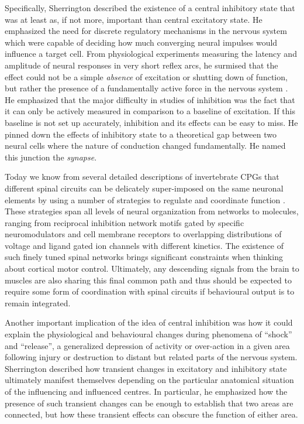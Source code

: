 Specifically, Sherrington described the existence of a central inhibitory state that was at least as, if not more, important than central excitatory state. He emphasized the need for discrete regulatory mechanisms in the nervous system which were capable of deciding how much converging neural impulses would influence a target cell. From physiological experiments measuring the latency and amplitude of neural responses in very short reflex arcs, he surmised that the effect could not be a simple \emph{absence} of excitation or shutting down of function, but rather the presence of a fundamentally active force in the nervous system \cite{Sherrington1965}. He emphasized that the major difficulty in studies of inhibition was the fact that it can only be actively measured in comparison to a baseline of excitation. If this baseline is not set up accurately, inhibition and its effects can be easy to miss. He pinned down the effects of inhibitory state to a theoretical gap between two neural cells where the nature of conduction changed fundamentally. He named this junction the \emph{synapse}.

Today we know from several detailed descriptions of invertebrate CPGs that different spinal circuits can be delicately super-imposed on the same neuronal elements by using a number of strategies to regulate and coordinate function \cite{Orlovsky1999,Selverston2010}. These strategies span all levels of neural organization from networks to molecules, ranging from reciprocal inhibition network motifs gated by specific neuromodulators and cell membrane receptors to overlapping distributions of voltage and ligand gated ion channels with different kinetics. The existence of such finely tuned spinal networks brings significant constraints when thinking about cortical motor control. Ultimately, any descending signals from the brain to muscles are also sharing this final common path and thus should be expected to require some form of coordination with spinal circuits if behavioural output is to remain integrated.

Another important implication of the idea of central inhibition was how it could explain the physiological and behavioural changes during phenomena of ``shock'' and ``release'', a generalized depression of activity or over-action in a given area following injury or destruction to distant but related parts of the nervous system. Sherrington described how transient changes in excitatory and inhibitory state ultimately manifest themselves depending on the particular anatomical situation of the influencing and influenced centres. In particular, he emphasized how the presence of such transient changes can be enough to establish that two areas are connected, but how these transient effects can obscure the function of either area.

